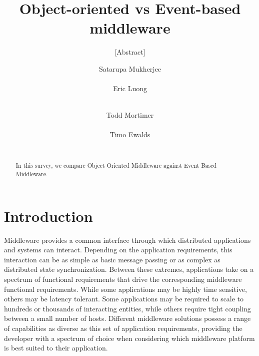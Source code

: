 \documentclass{acm_proc_article-sp}
\begin{document}
\title{Object-oriented vs Event-based middleware}
\subtitle{[Abstract]}


\author{
\alignauthor
Satarupa Mukherjee \\
       \\
\alignauthor
Eric Luong \\
       \\
\and  
\alignauthor 
Todd Mortimer \\
       \\
\alignauthor 
Timo Ewalds\\
      \\
}


\maketitle
\begin{abstract}

In this survey, we compare Object Oriented Middleware against Event Based Middleware.

\end{abstract}


\section{Introduction}
\label{sec:intro}


Middleware provides a common interface through which distributed applications and systems can interact. Depending on the application requirements, this interaction can be as simple as basic message passing or as complex as distributed state synchronization. Between these extremes, applications take on a spectrum of functional requirements that drive the corresponding middleware functional requirements. While some applications may be highly time sensitive, others may be latency tolerant. Some applications may be required to scale to hundreds or thousands of interacting entities, while others require tight coupling between a small number of hosts. Different middleware solutions possess a range of capabilities as diverse as this set of application requirements, providing the developer with a spectrum of choice when considering which middleware platform is best suited to their application.
\end{document}
